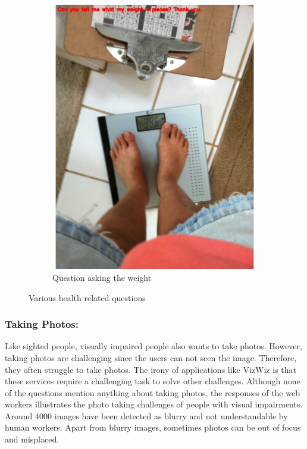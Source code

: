 \documentclass[sigconf]{acmart}
\begin{document}
\begin{figure}[hbp]
\begin{subfigure}[b]{0.3\columnwidth}
                \includegraphics[scale=0.2]{images/health_3.pdf} 
                 \caption{Question asking the weight}
                 \label{fig:weight}
        \end{subfigure}%
        \caption{Various health related questions} 
        \label{fig:health}
\end{figure}

\subsubsection{Taking Photos:} Like sighted people, visually impaired people also wants to take photos. However, taking photos are challenging since the users can not seen the image. Therefore, they often struggle to take photos. The irony of applications like VizWiz is that these services require a challenging task to solve other challenges. Although none of the questions mention anything about taking photos, the responses of the web workers illustrates the photo taking challenges of people with visual impairments. Around 4000 images have been detected as blurry and not understandable by human workers. Apart from blurry images, sometimes photos can be out of focus and misplaced. 
\end{document}
